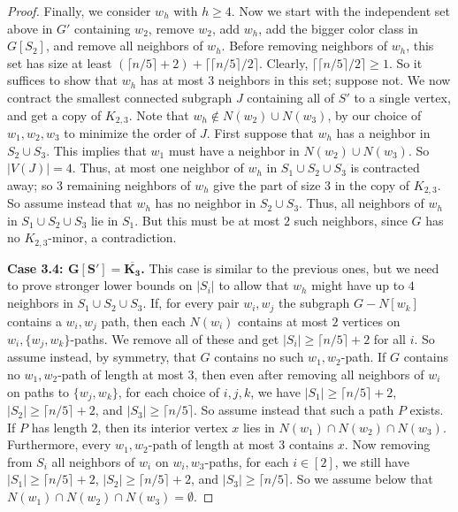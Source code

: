 \documentclass[11pt]{article}
\theoremstyle{definition}
\newcommand\ceil[1]{\lceil#1\rceil}
\renewcommand\ge\geqslant
\begin{document}
\begin{proof}
Finally, we consider $w_h$ with $h\ge 4$.  Now we start with the independent set above in $G'$ containing $w_2$, remove $w_2$, add $w_h$, add the bigger color class in $G[S_2]$, and remove all neighbors of $w_h$.  Before removing neighbors of $w_h$, this set has size at least $(\ceil{n/5}+2)+\ceil{\ceil{n/5}/2}$. 
Clearly, $\ceil{\ceil{n/5}/2}\ge 1$.
So it suffices to show that $w_h$ has at most $3$ neighbors in this set; suppose not.  We now contract the smallest connected subgraph $J$ containing
all of $S'$ to a single vertex, and get a copy of $K_{2,3}$.  Note that $w_h\notin N(w_2)\cup N(w_3)$, by our choice of $w_1,w_2,w_3$ to minimize the 
order of $J$.  First suppose that $w_h$ has a neighbor in $S_2\cup S_3$.  This implies that $w_1$ must have a neighbor in $N(w_2)\cup N(w_3)$.
So $|V(J)|=4$.  Thus, at most one neighbor of $w_h$ in $S_1\cup S_2\cup S_3$ is contracted away; so $3$ remaining neighbors of $w_h$ give the part of 
size $3$ in the copy of $K_{2,3}$.  So assume instead that $w_h$ has no neighbor in $S_2\cup S_3$.  Thus, all neighbors of $w_h$ in $S_1\cup S_2\cup S_3$
lie in $S_1$.  But this must be at most $2$ such neighbors, since $G$ has no $K_{2,3}$-minor, a contradiction.

\textbf{Case 3.4: $\bm{G[S']=\overline{K_3}}$.}
This case is similar to the previous ones, but we need to prove stronger lower bounds on $|S_i|$ to allow that $w_h$ might have up to $4$ neighbors in
$S_1\cup S_2\cup S_3$.  
If, for every pair $w_i,w_j$ the subgraph $G-N[w_k]$ contains a $w_i,w_j$ path, then each $N(w_i)$ contains at most $2$ vertices on $w_i,\{w_j,w_k\}$-paths.
We remove all of these and get $|S_i|\ge \ceil{n/5}+2$ for all $i$.  So assume instead, by symmetry, that $G$ contains no such $w_1,w_2$-path. 
If $G$ contains no $w_1,w_2$-path of length at most $3$, then even after removing all neighbors of $w_i$ on paths to $\{w_j,w_k\}$, for each choice of $i,j,k$,
we have $|S_1|\ge \ceil{n/5}+2$, $|S_2|\ge \ceil{n/5}+2$, and $|S_3|\ge \ceil{n/5}$.  So assume instead that such a path $P$ exists.  If $P$ has length $2$,
then its interior vertex $x$ lies in $N(w_1)\cap N(w_2)\cap N(w_3)$.  Furthermore, every $w_1,w_2$-path of length at most $3$ contains $x$.  Now removing
from $S_i$ all neighbors of $w_i$ on $w_i,w_3$-paths, for each $i\in [2]$, we still have 
$|S_1|\ge \ceil{n/5}+2$, $|S_2|\ge \ceil{n/5}+2$, and $|S_3|\ge \ceil{n/5}$.
So we assume below that $N(w_1)\cap N(w_2)\cap N(w_3) = \emptyset$.



\end{proof}
\end{document}
